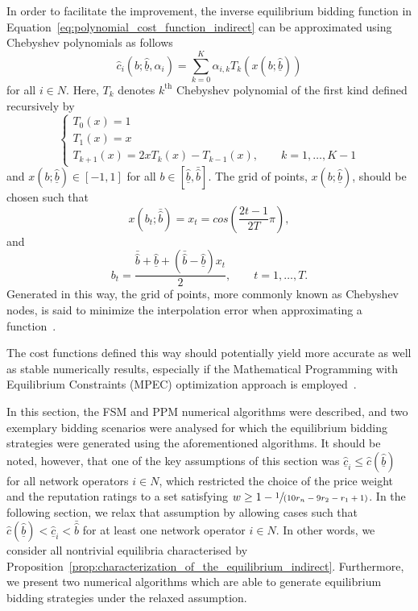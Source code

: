In order to facilitate the improvement, the inverse equilibrium bidding function in Equation~\eqref{eq:polynomial_cost_function_indirect} can be approximated using Chebyshev polynomials as follows
\begin{equation*}
  \displaystyle\hat{c}_i(b;\underline{\hat{b}},\alpha_i) = \sum_{k=0}^K \alpha_{i,k} T_k\left(x(b;\underline{\hat{b}})\right)
\end{equation*}
for all $i\in N$. Here, $T_k$ denotes $k^{\textrm{th}}$ Chebyshev polynomial of the first kind defined recursively by
\begin{equation*}
  \left\{
    \begin{array}{l}
      T_0(x) = 1\\
      T_1(x) = x\\
      T_{k+1}(x) = 2xT_k(x) - T_{k-1}(x), \qquad k=1,\ldots,K-1
    \end{array}
  \right.
\end{equation*}
and $x(b;\underline{\hat{b}})\in [-1,1]$ for all $b\in [\underline{\hat{b}}, \bar{\hat{b}}]$. The grid of points, $x(b;\underline{\hat{b}})$, should be chosen such that
\begin{equation*}
  \displaystyle x(b_t;\bar{\hat{b}}) = x_t = cos\left(\frac{2t-1}{2T}\pi\right),
\end{equation*}
and
\begin{equation*}
  b_t = \frac{\bar{\hat{b}} + \underline{\hat{b}} + (\bar{\hat{b}} - \underline{\hat{b}})x_t}{2}, \qquad t = 1,\ldots,T.
\end{equation*}
Generated in this way, the grid of points, more commonly known as Chebyshev nodes, is said to minimize the interpolation error when approximating a function~\cite{Hubbard2011}.

The cost functions defined this way should potentially yield more accurate as well as stable numerically results, especially if the Mathematical Programming with Equilibrium Constraints (MPEC) optimization approach is employed~\cite{HubbardPaarsch2011,Hubbard2011}.

In this section, the FSM and PPM numerical algorithms were described, and two exemplary bidding scenarios were analysed for which the equilibrium bidding strategies were generated using the aforementioned algorithms. It should be noted, however, that one of the key assumptions of this section was $\underline{\hat{c}}_i\leq \hat{c}(\underline{\hat{b}})$ for all network operators $i\in N$, which restricted the choice of the price weight and the reputation ratings to a set satisfying $w\geq 1 - \sfrac{1}{(10r_n - 9r_2 - r_1 + 1)}$. In the following section, we relax that assumption by allowing cases such that $\hat{c}(\underline{\hat{b}}) < \underline{\hat{c}}_i < \bar{\hat{b}}$ for at least one network operator $i\in N$. In other words, we consider all nontrivial equilibria characterised by Proposition~\ref{prop:characterization_of_the_equilibrium_indirect}. Furthermore, we present two numerical algorithms which are able to generate equilibrium bidding strategies under the relaxed assumption.


